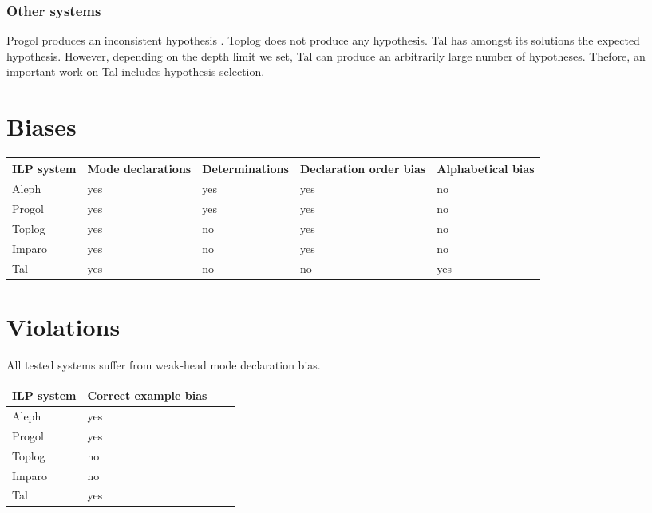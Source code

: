 \subsubsection{Other systems}
Progol produces an inconsistent hypothesis . Toplog does not produce any hypothesis. Tal has amongst its solutions the expected hypothesis. However, depending on the depth limit we set, Tal can produce an arbitrarily large number of hypotheses. Thefore, an important work on Tal includes hypothesis selection.

\section{Biases}
\begin{center}
    \begin{tabular}{ | l | l | l | l | p{5cm} |}
    \hline
    ILP system & Mode declarations & Determinations & Declaration order bias & Alphabetical bias \\ \hline
    Aleph & yes & yes & yes & no\\ \hline
    Progol & yes & yes & yes & no\\ \hline
    Toplog & yes & no & yes & no\\ \hline
    Imparo & yes & no & yes & no\\ \hline
    Tal & yes & no & no & yes\\ \hline
    \hline
    \end{tabular}
\end{center}

\section{Violations}
All tested systems suffer from weak-head mode declaration bias.
\begin{center}
    \begin{tabular}{ | l | l | l | p{5cm} |}
    \hline
    ILP system & Correct example bias\\ \hline
    Aleph & yes\\ \hline
    Progol & yes\\ \hline
    Toplog & no\\ \hline
    Imparo & no\\ \hline
    Tal & yes\\ \hline
    \hline
    \end{tabular}
\end{center}

